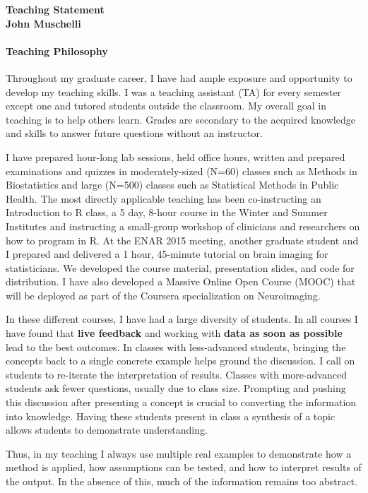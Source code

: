 \documentclass[12pt,a4paper]{article}
\author{John Muschelli}
\begin{document}
\thispagestyle{empty}

\begin{center}
{\bf
{\large Teaching Statement }\\
John Muschelli
}
\end{center}
\vspace{-2em}
\paragraph{Teaching Philosophy} Throughout my graduate career, I have had ample exposure and opportunity to develop my teaching skills.  I was a teaching assistant (TA) for every semester except one and tutored students outside the classroom.  My overall goal in teaching is to help others learn.  Grades are secondary to the acquired knowledge and skills to answer future questions without an instructor.  

I have prepared hour-long lab sessions, held office hours,  written and prepared examinations and quizzes in moderately-sized (N=60) classes such as Methods in Biostatistics and large (N=500) classes such as Statistical Methods in Public Health.  The most directly applicable teaching has been co-instructing an Introduction to R class, a 5 day, 8-hour course in the Winter and Summer Institutes and instructing a small-group workshop of clinicians and researchers on how to program in R.  At the ENAR 2015 meeting, another graduate student and I prepared and delivered a 1 hour, 45-minute tutorial on brain imaging for statisticians.  We developed the course material, presentation slides, and code for distribution.  I have also developed a Massive Online Open Course (MOOC) that will be deployed as part of the Coursera specialization on Neuroimaging. 

In these different courses, I have had a large diversity of students.  In all courses I have found that {\bf live feedback} and working with {\bf data as soon as possible} lead to the best outcomes.  In classes with less-advanced students, bringing the concepts back to a single concrete example helps ground the discussion.  I call on students to re-iterate the interpretation of results.  Classes with more-advanced students ask fewer questions, usually due to class size. Prompting and pushing this discussion after presenting a concept is crucial to converting the information into knowledge.  Having these students present in class a synthesis of a topic allows students to demonstrate understanding.

Thus, in my teaching I always use multiple real examples to demonstrate how a method is applied, how assumptions can be tested, and how to interpret results of the output. In the absence of this, much of the information remains too abstract.
\end{document}
